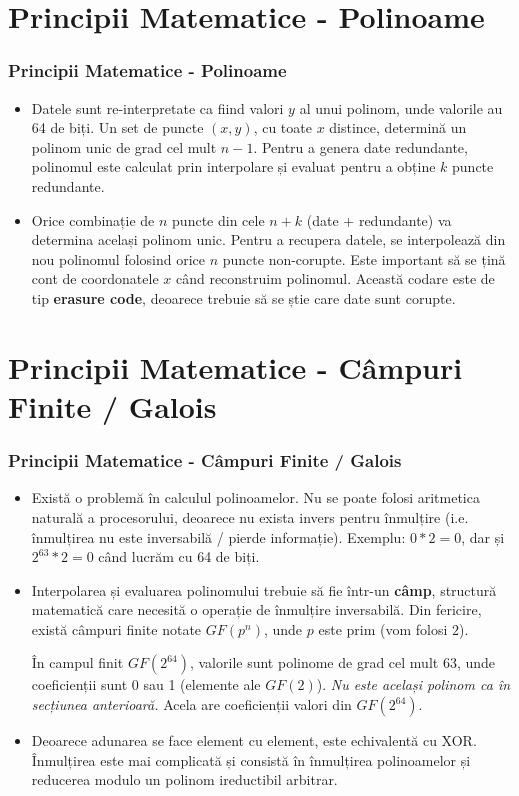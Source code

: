 \documentclass{beamer}
\begin{document}
\section{Principii Matematice - Polinoame}
\begin{frame}
\frametitle{Principii Matematice - Polinoame}
\begin{itemize}
\item
Datele sunt re-interpretate ca fiind valori $y$ al unui polinom, unde valorile au 64 de biți.
Un set de puncte $(x, y)$, cu toate $x$ distince, determină un polinom unic de grad cel mult $n-1$.
Pentru a genera date redundante, polinomul este calculat prin interpolare și evaluat pentru a obține $k$ puncte redundante.

\item
Orice combinație de $n$ puncte din cele $n+k$ (date + redundante) va determina același polinom unic.
Pentru a recupera datele, se interpolează din nou polinomul folosind orice $n$ puncte non-corupte.
Este important să se țină cont de coordonatele $x$ când reconstruim polinomul.
Această codare este de tip \textbf{erasure code}, deoarece trebuie să se știe care date sunt corupte.
\end{itemize}
\end{frame}

\section{Principii Matematice - Câmpuri Finite / Galois}
\begin{frame}
\frametitle{Principii Matematice - Câmpuri Finite / Galois}
\begin{itemize}
\item
Există o problemă în calculul polinoamelor.
Nu se poate folosi aritmetica naturală a procesorului, deoarece nu exista invers pentru înmulțire (i.e. înmulțirea nu este inversabilă / pierde informație).
Exemplu: $0 * 2 = 0$, dar și $2^{63} * 2 = 0$ când lucrăm cu 64 de biți.

\item
Interpolarea și evaluarea polinomului trebuie să fie într-un \textbf{câmp}, structură matematică care necesită o operație de înmulțire inversabilă.
Din fericire, există câmpuri finite notate $GF(p^n)$, unde $p$ este prim (vom folosi $2$).

În campul finit $GF(2^{64})$, valorile sunt polinome de grad cel mult 63, unde coeficienții sunt 0 sau 1 (elemente ale $GF(2)$).
\textit{Nu este același polinom ca în secțiunea anterioară.} Acela are coeficienții valori din $GF(2^{64})$.

\item
Deoarece adunarea se face element cu element, este echivalentă cu XOR.
Înmulțirea este mai complicată și consistă în înmulțirea polinoamelor și reducerea modulo un polinom ireductibil arbitrar.

\end{itemize}
\end{frame}
\end{document}
